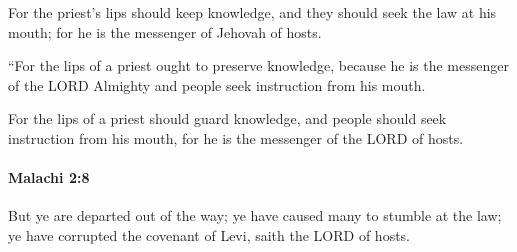 			\begin{versebox}
					\item[BHS] 
					\item[LXX] 
					\item[ASV] For the priest's lips should keep knowledge, and they should seek the law at his mouth; for he is the messenger of Jehovah of hosts.
					\item[NIV] “For the lips of a priest ought to preserve knowledge, because he is the messenger of the LORD Almighty and people seek instruction from his mouth.
					\item[NRSV] For the lips of a priest should guard knowledge, and people should seek instruction from his mouth, for he is the messenger of the LORD of hosts.
			\end{versebox}

		\paragraph{Malachi 2:8} %
			\label{MALACHI-2-8}

			But ye are departed out of the way; ye have caused many to stumble at the law; ye have corrupted the covenant of Levi, saith the LORD of hosts.

